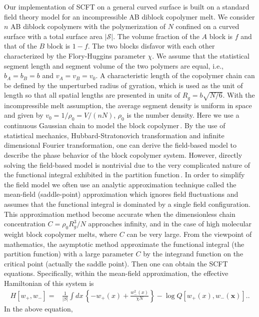 \documentclass[final,1p,times]{elsarticle}
\newcommand{\bx}{\mathbf{x}}
\newcommand{\calS}{\mathcal{S}}
\begin{document}
Our implementation of SCFT on a general curved surface is built on a
standard field theory model for an incompressible AB diblock copolymer melt.
We consider $n$ AB diblock copolymers with the polymerization of $N$
confined on a curved surface with a total surface area $|\calS|$.
The volume fraction of the $A$ block is $f$ and that of the $B$ block is $1-f$.
The two blocks disfavor with each other characterized by the
Flory-Huggins parameter $\chi$. 
We assume that the statistical segment length and segment volume
of the two polymers are equal, i.e., $b_A=b_B=b$ and $v_A=v_B=v_0$.
A characteristic length of the copolymer chain can be defined
by the unperturbed radius of gyration, which is used as the unit
of length so that all spatial lengths are presented in units of
$R_g=b\sqrt{N/6}$. With the incompressible melt assumption, the
average segment density is uniform in space and given by
$v_0=1/\rho_0=V/(n N)$, $\rho_0$ is the number density. Here we use a
continuous Gaussian chain to model the block
copolymer\,\cite{fredrickson2006equilibrium,matsen2002standard}.
By the use of statistical mechanics, 
Hubbard-Stratonovich transformation and infinite dimensional
Fourier transformation, one can derive the
field-based model to describe the phase behavior of the block
copolymer system. However, directly solving the field-based model
is nontrivial due to the very complicated nature of the
functional integral exhibited in the partition
function\,\cite{fredrickson2006equilibrium}. 
In order to simplify the field model we often use an analytic
approximation technique called the mean-field (saddle-point)
approximation which ignores field fluctuations and assumes that
the functional integral is dominated by a single field configuration.
This approximation method become accurate when the dimensionless
chain concentration $C=\rho_0 R_g^3/N$ approaches infinity, and
in the case of high molecular weight block copolymer melts, where
$C$ can be very large. From the viewpoint of mathematics, the
asymptotic method approximate the functional integral (the
partition function) with a large parameter $C$ by the integrand
function on the critical point (actually the saddle point).
Then one can obtain the SCFT equations.
Specifically, within the mean-field approximation, the effective
Hamiltonian of this system is
\begin{align}
  H[w_+, w_-] = &
  \frac{1}{|S|}\int d x\, \left\{ 
  -w_+(x) + \frac{w_-^2(x)}{\chi N} 
  \right\} -\log Q[w_+(x), w_-(\bx)]..
  \label{eq:hamiltonian}
\end{align}
In the above equation, 
\end{document}
